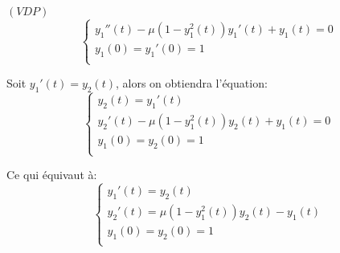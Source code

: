 \documentclass[a4paper,12pt,landscape]{article}
\begin{document}
$(VDP)$
\[
\left\{
\begin{array}{ll}
y_1''(t)-\mu(1-y_1^{2}(t))y_1'(t)+y_1(t)=0\\
y_1(0)=y_1'(0)=1\\
\end{array}
\right.
\]

Soit $y_1'(t)=y_2(t)$, alors on obtiendra l'équation:
\[
\left\{
\begin{array}{ll}
y_2(t)=y_1'(t)\\
y_2'(t)-\mu(1-y_1^{2}(t))y_2(t)+y_1(t)=0\\
y_1(0)=y_2(0)=1\\
\end{array}
\right.
\]

Ce qui équivaut à:
\[
\left\{
\begin{array}{ll}
y_1'(t)=y_2(t)\\
y_2'(t)=\mu(1-y_1^{2}(t))y_2(t)-y_1(t)\\
y_1(0)=y_2(0)=1\\
\end{array}
\right.
\]
\end{document}
